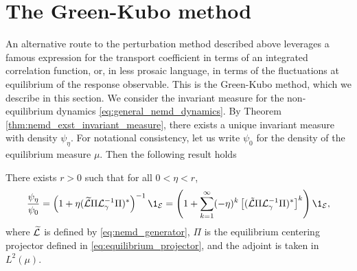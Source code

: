 \section{The Green-Kubo method}
An alternative route to the perturbation method described above leverages a famous expression for the transport coefficient in terms of an integrated correlation function, or, in less prosaic language, in terms of the fluctuations at equilibrium of the response observable.
This is the Green-Kubo method, which we describe in this section. We consider the invariant measure for the non-equilibrium dynamics \eqref{eq:general_nemd_dynamics}. By Theorem \ref{thm:nemd_exst_invariant_measure}, there exists a unique invariant measure with density $\psi_\eta$.
For notational consistency, let us write $\psi_0$ for the density of the equilibrium measure $\mu$. Then the following result holds 
\begin{theorem}
    \label{thm:nemd_steady_state_series}
    There exists $r>0$ such that for all $0<\eta<r$,
    \begin{equation}
    \label{eq:nemd_steady_state_series}
        \frac{\psi_\eta}{\psi_0}=\left(1+\eta(\widetilde{\cL} \Pi \cL_\gamma^{-1}\Pi)^*\right)^{-1}\1_{\mathcal E}=\left(1+\sum_{k=1}^{\infty}(-\eta)^k\left[(\tilde \cL \Pi\cL_\gamma^{-1}\Pi)^*\right]^k\right)\1_{\mathcal E},
    \end{equation}
    where $\widetilde{\mathcal{L}}$ is defined by \eqref{eq:nemd_generator}, $\Pi$ is the equilibrium centering projector defined in \eqref{eq:equilibrium_projector}, and the adjoint is taken in $L^2(\mu)$.
\end{theorem}
